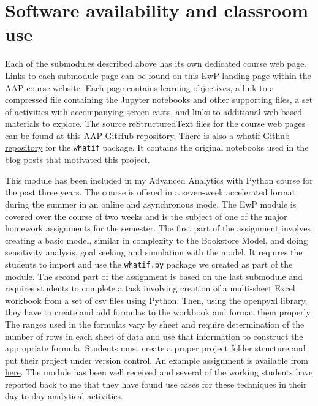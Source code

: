 \documentclass[ited,blindrev]{informs3}              %
\newcommand{\code}[1]{\texttt{#1}}
\begin{document}
\section{Software availability and classroom use}
\label{sec:software}

Each of the submodules described above has its own dedicated course web page. Links to each submodule page can be found on \href{http://www.sba.oakland.edu/faculty/isken/courses/aap/mod3_excel_with_python.html}{this EwP landing page} within the AAP course website. Each page contains learning objectives, a link to a compressed file containing the Jupyter notebooks and other supporting files, a set of activities with accompanying screen casts, and links to additional web based materials to explore. The source reStructuredText files for the course web pages can be found at \href{https://github.com/misken/aap}{this AAP GitHub repository}. There is also a \href{https://github.com/misken/whatif}{whatif Github repository} for the \code{whatif} package. It contains the original notebooks used in the blog posts that motivated this project.

This module has been included in my Advanced Analytics with Python course for the past three years. The course is offered in a seven-week accelerated format during the summer in an online and asynchronous mode. The EwP module is covered over the course of two weeks and is the subject of one of the major homework assignments for the semester. The first part of the assignment involves creating a basic model, similar in complexity to the Bookstore Model, and doing sensitivity analysis, goal seeking and simulation with the model. It requires the students to import and use the \code{whatif.py} package we created as part of the module. The second part of the assignment is based on the last submodule and requires  students to complete a task involving creation of a multi-sheet Excel workbook from a set of csv files using Python. Then, using the openpyxl library, they have to create and add formulas to the workbook and format them properly. The ranges used in the formulas vary by sheet and require determination of the number of rows in each sheet of data and use that information to construct the appropriate formula. Students must create a proper project folder structure and put their project under version control. An example assignment is available from \href{https://drive.google.com/file/d/1prf8acZXZ4RoYBgQ8e9-eijA65uV7T-V/view?usp=sharing}{here}. The module has been well received and several of the working students have reported back to me that they have found use cases for these techniques in their day to day analytical activities.
\end{document}

